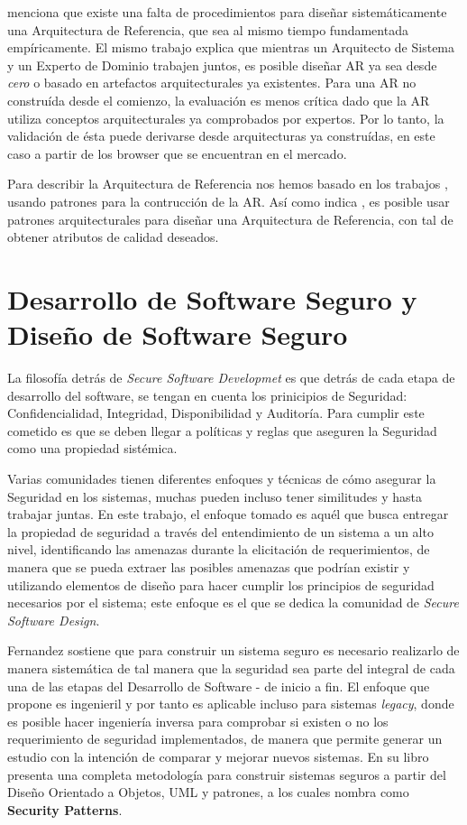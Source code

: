 \cite{Galster2011a} menciona que existe una falta de procedimientos para diseñar sistemáticamente una Arquitectura de Referencia, que sea al mismo tiempo fundamentada empíricamente. El mismo trabajo explica que mientras un Arquitecto de Sistema y un Experto de Dominio trabajen juntos, es posible diseñar AR ya sea desde \textit{cero} o basado en artefactos arquitecturales ya existentes. Para una AR no construída desde el comienzo, la evaluación es menos crítica dado que la AR utiliza conceptos arquitecturales ya comprobados por expertos. Por lo tanto, la validación de ésta puede derivarse desde arquitecturas ya construídas, en este caso a partir de los browser que se encuentran en el mercado.

Para describir la Arquitectura de Referencia nos hemos basado en los trabajos \cite{Hashizume2014Reference, Submitted2014}, usando patrones para la contrucción de la AR. Así como indica \cite{Bass2012}, es posible usar patrones arquitecturales para diseñar una Arquitectura de Referencia, con tal de obtener atributos de calidad deseados.



\section{Desarrollo de Software Seguro y Diseño de Software Seguro}
\label{chap2:SSD}

La filosofía detrás de \textit{Secure Software Developmet} es que detrás de cada etapa de desarrollo del software, se tengan en cuenta los prinicipios de Seguridad: Confidencialidad, Integridad, Disponibilidad y Auditoría. Para cumplir este cometido es que se deben llegar a políticas y reglas que aseguren la Seguridad como una propiedad sistémica.

Varias comunidades tienen diferentes enfoques y técnicas de cómo asegurar la Seguridad en los sistemas, muchas pueden incluso tener similitudes y hasta trabajar juntas. En este trabajo, el enfoque tomado es aquél que busca entregar la propiedad de seguridad a través del entendimiento de un sistema a un alto nivel, identificando las amenazas durante la elicitación de requerimientos, de manera que se pueda extraer las posibles amenazas que podrían existir y utilizando elementos de diseño para hacer cumplir los principios de seguridad necesarios por el sistema; este enfoque es el que se dedica la comunidad de \textit{Secure Software Design}. 

Fernandez \cite{fernandez2013security} sostiene que para construir un sistema seguro es necesario realizarlo de manera sistemática de tal manera que la seguridad sea parte del integral de cada una de las etapas del Desarrollo de Software - de inicio a fin. El enfoque que propone es ingenieril y por tanto es aplicable incluso para sistemas \textit{legacy}, donde es posible hacer ingeniería inversa para comprobar si existen o no los requerimiento de seguridad implementados, de manera que permite generar un estudio con la intención de comparar y mejorar nuevos sistemas. En su libro \cite{fernandez2013security} presenta una completa metodología para construir sistemas seguros a partir del Diseño Orientado a Objetos, UML y patrones, a los cuales nombra como \textbf{Security Patterns}.

